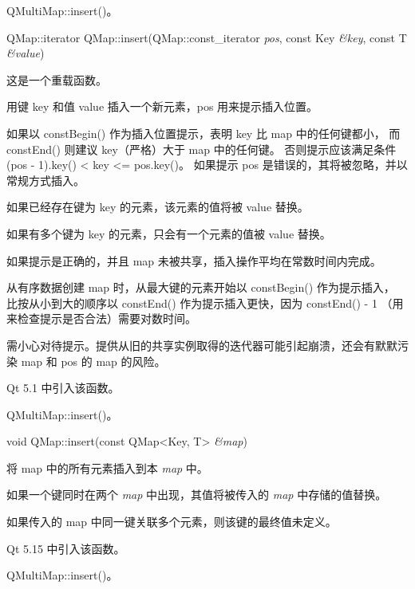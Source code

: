 \begin{seeAlso}
QMultiMap::insert()。
\end{seeAlso}

\splitLine

QMap::iterator QMap::insert(QMap::const\_iterator \emph{pos}, const Key \emph{\&key}, const T \emph{\&value})

这是一个重载函数。

用键 key 和值 value 插入一个新元素，pos 用来提示插入位置。

如果以 constBegin() 作为插入位置提示，表明 key 比 map 中的任何键都小，
而 constEnd() 则建议 key（严格）大于 map 中的任何键。
否则提示应该满足条件 (pos - 1).key() < key <= pos.key()。
如果提示 pos 是错误的，其将被忽略，并以常规方式插入。

如果已经存在键为 key 的元素，该元素的值将被 value 替换。

如果有多个键为 key 的元素，只会有一个元素的值被 value 替换。

如果提示是正确的，并且 map 未被共享，插入操作平均在常数时间内完成。

从有序数据创建 map 时，从最大键的元素开始以 constBegin() 作为提示插入，
比按从小到大的顺序以 constEnd() 作为提示插入更快，因为 constEnd() - 1 （用来检查提示是否合法）需要对数时间。

\begin{notice}
需小心对待提示。提供从旧的共享实例取得的迭代器可能引起崩溃，还会有默默污染 map 和 pos 的 map 的风险。
\end{notice}

Qt 5.1 中引入该函数。

\begin{seeAlso}
QMultiMap::insert()。
\end{seeAlso}

\splitLine

void QMap::insert(const QMap<Key, T> \emph{\&map})

将 map 中的所有元素插入到本 \emph{map} 中。

如果一个键同时在两个 \emph{map} 中出现，其值将被传入的 \emph{map} 中存储的值替换。

\begin{seeAlso}
如果传入的 map 中同一键关联多个元素，则该键的最终值未定义。
\end{seeAlso}

Qt 5.15 中引入该函数。

\begin{seeAlso}
QMultiMap::insert()。
\end{seeAlso}

